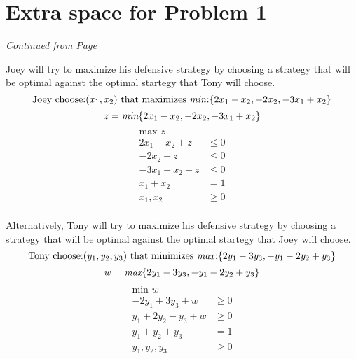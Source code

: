\documentclass[11pt]{article}
\begin{document}
\newpage

% 
% 
% 
% 
% 

 
 \section*{Extra space for Problem 1}
 \emph{Continued from Page \pageref{pg:end-of-p1}}
 \label{pg:p1-continuation}

Joey will try to maximize his defensive strategy by choosing a strategy that
will be optimal against the optimal startegy that Tony will choose.
$$\mbox{Joey choose:} (x_1,x_2)\mbox{ that maximizes \emph{min}:}\{2x_1-x_2,-2x_2,-3x_1+x_2\}$$
$$z=\emph{min}\{2x_1-x_2,-2x_2,-3x_1+x_2\}$$
\begin{equation*}
  \begin{aligned}
    \mbox{max } z &\\
    2x_1-x_2+z&\leq 0\\
    -2x_2+z&\leq 0\\
    -3x_1+x_2+z&\leq 0\\
    x_1+x_2 &= 1\\
    x_1,x_2&\geq 0\\
  \end{aligned}
\end{equation*}
 
Alternatively, Tony will try to maximize his defensive strategy by choosing a strategy that
will be optimal against the optimal startegy that Joey will choose.
$$\mbox{Tony choose:} (y_1,y_2,y_3)\mbox{ that minimizes \emph{max}:}\{2y_1-3y_3,-y_1-2y_2+y_3\}$$
$$w=\emph{max}\{2y_1-3y_3,-y_1-2y_2+y_3\}$$
\begin{equation*}
  \begin{aligned}
    \mbox{min } w &\\
    -2y_1+3y_3+w&\geq 0\\
    y_1+2y_2-y_3+w&\geq 0\\
    y_1+y_2+y_3 &= 1\\
    y_1,y_2,y_3&\geq 0\\
  \end{aligned}
\end{equation*}
\end{document}
